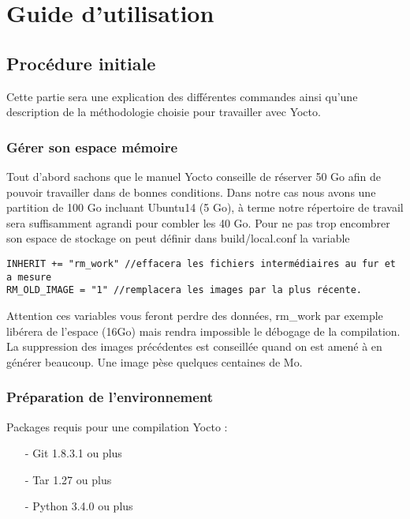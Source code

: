 
\chapter{Guide d'utilisation} %

\label{Chapter1} %


\section{Procédure initiale}
Cette partie sera une explication des différentes commandes ainsi qu’une description de la
méthodologie choisie pour travailler avec Yocto.
\subsection{Gérer son espace mémoire}

Tout d’abord sachons que le manuel Yocto conseille de réserver 50 Go afin
de pouvoir travailler dans de bonnes conditions. Dans notre cas nous avons une
partition de 100 Go incluant Ubuntu14 (5 Go), à terme notre répertoire de
travail sera suffisamment agrandi pour combler les 40 Go.
Pour ne pas trop encombrer son espace de stockage on peut définir dans build/local.conf la variable

\begin{lstlisting}
INHERIT += "rm_work" //effacera les fichiers intermédiaires au fur et a mesure
RM_OLD_IMAGE = "1" //remplacera les images par la plus récente.
\end{lstlisting}

Attention ces variables vous feront perdre des données, rm\_work par exemple
libérera de l'espace (16Go) mais rendra impossible le débogage de la compilation.
La suppression des images précédentes est conseillée quand on est amené à en
générer beaucoup. Une image pèse quelques centaines de Mo.
\subsection{Préparation de l’environnement}
Packages requis pour une compilation Yocto :

\begin{itemize}
	\item[-] Git 1.8.3.1 ou plus
	\item[-] Tar 1.27 ou plus
	\item[-] Python 3.4.0 ou plus
\end{itemize}

